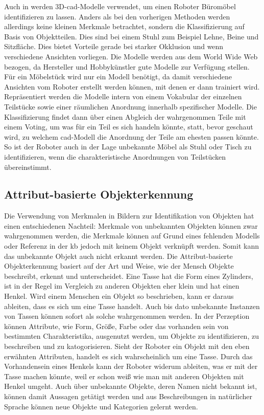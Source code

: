 Auch in \citep{modelsWWW} werden 3D-\gls{cad}-Modelle verwendet, um einen Roboter Büromöbel identifizieren zu lassen. Anders als bei den vorherigen Methoden werden allerdings keine kleinen Merkmale betrachtet, sondern die Klassifizierung auf Basis von Objektteilen. Dies sind bei einem Stuhl zum Beispiel Lehne, Beine und Sitzfläche. Dies bietet Vorteile gerade bei starker Okklusion und wenn verschiedene Ansichten vorliegen. Die Modelle werden aus dem World Wide Web bezogen, da Hersteller und Hobbykünstler gute Modelle zur Verfügung stellen. Für ein Möbelstück wird nur ein Modell benötigt, da damit verschiedene Ansichten vom Roboter erstellt werden können, mit denen er dann trainiert wird. Repräsentiert werden die Modelle intern von einem Vokabular der einzelnen Teilstücke sowie einer räumlichen Anordnung innerhalb spezifischer Modelle. Die Klassifizierung findet dann über einen Abgleich der wahrgenommen Teile mit einem Voting, um was für ein Teil es sich handeln könnte, statt, bevor geschaut wird, zu welchem \gls{cad}-Modell die Anordnung der Teile am ehesten passen könnte. So ist der Roboter auch in der Lage unbekannte Möbel als Stuhl oder Tisch zu identifizieren, wenn die charakteristische Anordnungen von Teilstücken übereinstimmt.   

\subsection{Attribut-basierte Objekterkennung}
\label{sec:aboi}

Die Verwendung von Merkmalen in Bildern zur Identifikation von Objekten hat einen entschiedenen Nachteil: Merkmale von unbekannten Objekten können zwar wahrgenommen werden, die Merkmale können auf Grund eines fehlenden Modells oder Referenz in der \gls{kb} jedoch mit keinem Objekt verknüpft werden. Somit kann das unbekannte Objekt auch nicht erkannt werden. \newline
Die Attribut-basierte Objekterkennung basiert auf der Art und Weise, wie der Mensch Objekte beschreibt, erkennt und unterscheidet. Eine Tasse hat die Form eines Zylinders, ist in der Regel im Vergleich zu anderen Objekten eher klein und hat einen Henkel. Wird einem Menschen ein Objekt so beschrieben, kann er daraus ableiten, dass es sich um eine Tasse handelt. Auch bis dato unbekannte Instanzen von Tassen können sofort als solche wahrgenommen werden. In der Perzeption können Attribute, wie Form, Größe, Farbe oder das vorhanden sein von bestimmten Charakteristika, ausgenutzt werden, um Objekte zu identifizieren, zu beschreiben und zu katogorisieren. Sieht der Roboter ein Objekt mit den eben erwähnten Attributen, handelt es sich wahrscheinlich um eine Tasse. Durch das Vorhandensein eines Henkels kann der Roboter widerum ableiten, was er mit der Tasse machen könnte, weil er schon weiß wie man mit anderen Objekten mit Henkel umgeht. Auch über unbekannte Objekte, deren Namen nicht bekannt ist, können damit Aussagen getätigt werden und aus Beschreibungen in natürlicher Sprache können neue Objekte und Kategorien gelernt werden. \cite{descObjbyAtr, atrBasedObjIden} \par

